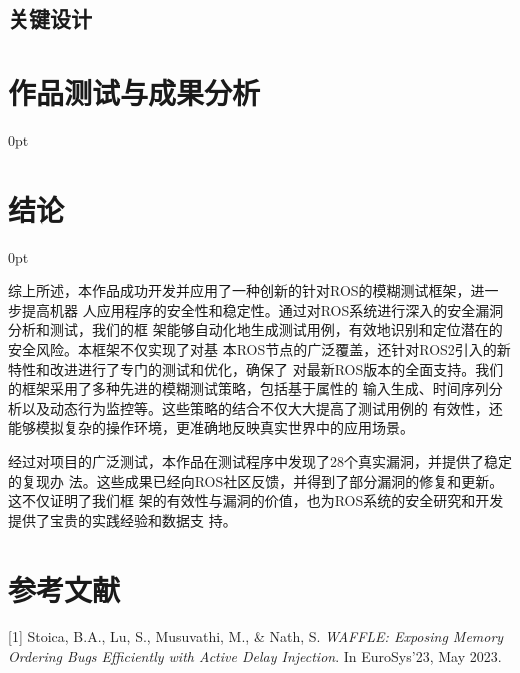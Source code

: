 \documentclass[zihao=-4]{ctexart}
\newcommand{\setParDis}{\setlength {\parskip} {0pt} }
\begin{document}
\begin{spacing}{1.5}
\subsection{关键设计} %


\section{作品测试与成果分析} %
\setParDis %




\section*{结论}%
\setParDis %
综上所述，本作品成功开发并应用了一种创新的针对ROS的模糊测试框架，进一步提高机器
人应用程序的安全性和稳定性。通过对ROS系统进行深入的安全漏洞分析和测试，我们的框
架能够自动化地生成测试用例，有效地识别和定位潜在的安全风险。本框架不仅实现了对基
本ROS节点的广泛覆盖，还针对ROS2引入的新特性和改进进行了专门的测试和优化，确保了
对最新ROS版本的全面支持。我们的框架采用了多种先进的模糊测试策略，包括基于属性的
输入生成、时间序列分析以及动态行为监控等。这些策略的结合不仅大大提高了测试用例的
有效性，还能够模拟复杂的操作环境，更准确地反映真实世界中的应用场景。

经过对项目的广泛测试，本作品在测试程序中发现了28个真实漏洞，并提供了稳定的复现办
法。这些成果已经向ROS社区反馈，并得到了部分漏洞的修复和更新。这不仅证明了我们框
架的有效性与漏洞的价值，也为ROS系统的安全研究和开发提供了宝贵的实践经验和数据支
持。


\end{spacing}
\newpage

\section*{参考文献} %
[1] Stoica, B.A., Lu, S., Musuvathi, M., \& Nath, S. \textit{WAFFLE: Exposing Memory Ordering Bugs Efficiently with Active Delay Injection}. In EuroSys'23, May 2023. 
\end{document}
